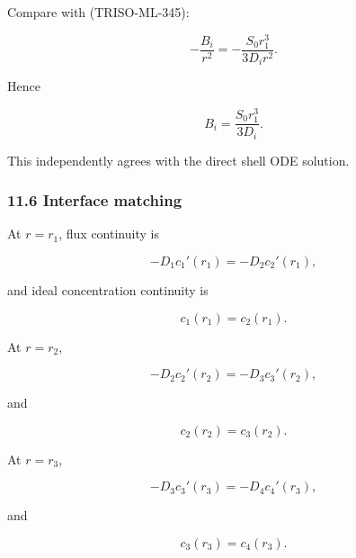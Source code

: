 \documentclass[11pt,a4paper]{article}
\begin{document}
Compare with (TRISO-ML-345):

\begin{equation}
-\frac{B_i}{r^2}
=
-\frac{S_0r_1^3}{3D_ir^2}.
\tag{TRISO-ML-351}
\label{eq:triso-ml-351}
\end{equation}

Hence

\begin{equation}
\boxed{
B_i=\frac{S_0r_1^3}{3D_i}.
}
\tag{TRISO-ML-352}
\label{eq:triso-ml-352}
\end{equation}

This independently agrees with the direct shell ODE solution.

\subsubsection*{11.6 Interface matching}

At $r=r_1$, flux continuity is

\begin{equation}
-D_1c_1'(r_1)
=
-D_2c_2'(r_1),
\tag{TRISO-ML-353}
\label{eq:triso-ml-353}
\end{equation}

and ideal concentration continuity is

\begin{equation}
c_1(r_1)=c_2(r_1).
\tag{TRISO-ML-354}
\label{eq:triso-ml-354}
\end{equation}

At $r=r_2$,

\begin{equation}
-D_2c_2'(r_2)
=
-D_3c_3'(r_2),
\tag{TRISO-ML-355}
\label{eq:triso-ml-355}
\end{equation}

and

\begin{equation}
c_2(r_2)=c_3(r_2).
\tag{TRISO-ML-356}
\label{eq:triso-ml-356}
\end{equation}

At $r=r_3$,

\begin{equation}
-D_3c_3'(r_3)
=
-D_4c_4'(r_3),
\tag{TRISO-ML-357}
\label{eq:triso-ml-357}
\end{equation}

and

\begin{equation}
c_3(r_3)=c_4(r_3).
\tag{TRISO-ML-358}
\label{eq:triso-ml-358}
\end{equation}
\end{document}
